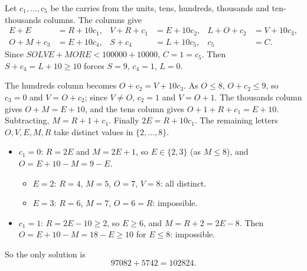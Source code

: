 Let $c_1,\dots,c_5$ be the carries from the units, tens, hundreds, thousands and ten-thousands columns. The columns give
\begin{align*}
E+E&=R+10c_1, & V+R+c_1&=E+10c_2, & L+O+c_2&=V+10c_3,\\
O+M+c_3&=E+10c_4, & S+c_4&=L+10c_5, & c_5&=C.
\end{align*}
Since $SOLVE+MORE<100000+10000$, $C=1=c_5$. Then $S+c_4=L+10\ge10$ forces $S=9$, $c_4=1$, $L=0$.

The hundreds column becomes $O+c_2=V+10c_3$. As $O\le8$, $O+c_2\le9$, so $c_3=0$ and $V=O+c_2$; since $V\ne O$, $c_2=1$ and $V=O+1$. The thousands column gives $O+M=E+10$, and the tens column gives $O+1+R+c_1=E+10$. Subtracting, $M=R+1+c_1$. Finally $2E=R+10c_1$. The remaining letters $O,V,E,M,R$ take distinct values in $\{2,\dots,8\}$.
\begin{itemize}
\item $c_1=0$: $R=2E$ and $M=2E+1$, so $E\in\{2,3\}$ (as $M\le8$), and $O=E+10-M=9-E$.
\begin{itemize}
\item $E=2$: $R=4$, $M=5$, $O=7$, $V=8$: all distinct.
\item $E=3$: $R=6$, $M=7$, $O=6=R$: impossible.
\end{itemize}
\item $c_1=1$: $R=2E-10\ge2$, so $E\ge6$, and $M=R+2=2E-8$. Then $O=E+10-M=18-E\ge10$ for $E\le8$: impossible.
\end{itemize}
So the only solution is
\[\boxed{97082+5742=102824}.\]
